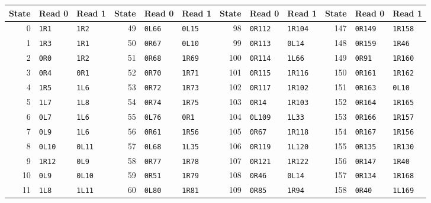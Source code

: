 \begingroup\footnotesize\setlength{\tabcolsep}{4pt}
\begin{center}
\begin{tabular}{@{}rll@{\quad}rll@{\quad}rll@{\quad}rll@{}}
\toprule
State & Read 0 & Read 1 & State & Read 0 & Read 1 & State & Read 0 & Read 1 & State & Read 0 & Read 1\\\midrule
0 & \texttt{1R1} & \texttt{1R2} & 49 & \texttt{0L66} & \texttt{0L15} & 98 & \texttt{0R112} & \texttt{1R104} & 147 & \texttt{0R149} & \texttt{1R158}\\
1 & \texttt{1R3} & \texttt{1R1} & 50 & \texttt{0R67} & \texttt{0L10} & 99 & \texttt{0R113} & \texttt{0L14} & 148 & \texttt{0R159} & \texttt{1R46}\\
2 & \texttt{0R0} & \texttt{1R2} & 51 & \texttt{0R68} & \texttt{1R69} & 100 & \texttt{0R114} & \texttt{1L66} & 149 & \texttt{0R91} & \texttt{1R160}\\
3 & \texttt{0R4} & \texttt{0R1} & 52 & \texttt{0R70} & \texttt{1R71} & 101 & \texttt{0R115} & \texttt{1R116} & 150 & \texttt{0R161} & \texttt{1R162}\\
4 & \texttt{1R5} & \texttt{1L6} & 53 & \texttt{0R72} & \texttt{1R73} & 102 & \texttt{0R117} & \texttt{1R102} & 151 & \texttt{0R163} & \texttt{0L10}\\
5 & \texttt{1L7} & \texttt{1L8} & 54 & \texttt{0R74} & \texttt{1R75} & 103 & \texttt{0R14} & \texttt{1R103} & 152 & \texttt{0R164} & \texttt{1R165}\\
6 & \texttt{0L7} & \texttt{1L6} & 55 & \texttt{0L76} & \texttt{0R1} & 104 & \texttt{0L109} & \texttt{1L33} & 153 & \texttt{0R166} & \texttt{1R157}\\
7 & \texttt{0L9} & \texttt{1L6} & 56 & \texttt{0R61} & \texttt{1R56} & 105 & \texttt{0R67} & \texttt{1R118} & 154 & \texttt{0R167} & \texttt{1R156}\\
8 & \texttt{0L10} & \texttt{0L11} & 57 & \texttt{0L68} & \texttt{1L35} & 106 & \texttt{0R119} & \texttt{1L120} & 155 & \texttt{0R135} & \texttt{1R130}\\
9 & \texttt{1R12} & \texttt{0L9} & 58 & \texttt{0R77} & \texttt{1R78} & 107 & \texttt{0R121} & \texttt{1R122} & 156 & \texttt{0R147} & \texttt{1R40}\\
10 & \texttt{0L9} & \texttt{0L10} & 59 & \texttt{0R51} & \texttt{1R79} & 108 & \texttt{0R46} & \texttt{0L14} & 157 & \texttt{0R134} & \texttt{1R168}\\
11 & \texttt{1L8} & \texttt{1L11} & 60 & \texttt{0L80} & \texttt{1R81} & 109 & \texttt{0R85} & \texttt{1R94} & 158 & \texttt{0R40} & \texttt{1L169}\\

\end{tabular}
\end{center}
